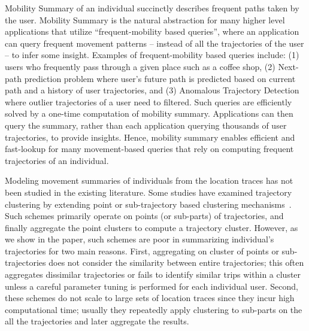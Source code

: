 Mobility Summary of an individual succinctly describes frequent paths taken by the user. Mobility Summary is the natural abstraction for many higher level applications that utilize ``frequent-mobility based queries'', where an application can query frequent movement patterns -- instead of all the trajectories of the user -- to infer some insight. Examples of frequent-mobility based queries include: (1) users who frequently pass through a given place such as a coffee shop, (2) Next-path prediction problem where user's future path is predicted based on current path and a history of user trajectories, and  (3) Anomalous Trajectory Detection where outlier trajectories of a user need to filtered. Such queries are efficiently solved by a one-time computation of mobility summary. Applications can then query the summary, rather than each application querying thousands of user trajectories, to provide insights. Hence, mobility summary enables efficient and fast-lookup for many movement-based queries that rely on computing frequent trajectories of an individual. 


Modeling movement summaries of individuals from the location traces has not been studied in the existing literature. Some studies have examined trajectory clustering by extending point or sub-trajectory based clustering mechanisms~\cite{Li2010,Lee2007}. Such schemes primarily operate on points (or sub-parts) of trajectories, and finally aggregate the point clusters to compute a trajectory cluster. However, as we show in the paper, such schemes are poor in summarizing individual's trajectories for two main reasons. First, aggregating on cluster of points or sub-trajectories does not consider the similarity between entire trajectories; this often aggregates dissimilar trajectories or fails to identify similar trips within a cluster unless a careful parameter tuning is performed for each individual user. Second, these schemes do not scale to large sets of location traces since they incur high computational time; usually they repeatedly apply clustering to sub-parts on the all the trajectories and later aggregate the results. 

